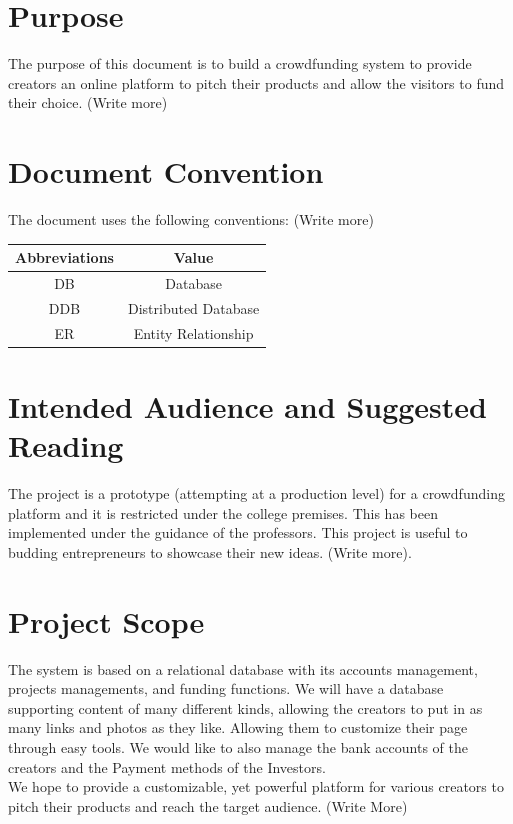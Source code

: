 \documentclass{report}[12pt]
\begin{document}
\section{Purpose}
The purpose of this document is to build a crowdfunding system to provide creators an online platform to pitch their products and allow the visitors to fund their choice. (Write more)

\section{Document Convention}
The document uses the following conventions: (Write more)
\begin{table}[h!]
    \centering
    \begin{tabular}{||c c||}
        \hline \hline 
         \textbf{Abbreviations}&\textbf{Value}  \\
         \hline
         DB&Database \\
         DDB&Distributed Database \\
         ER&Entity Relationship \\
        \hline \hline
    \end{tabular}
\end{table}

\section{Intended Audience and Suggested Reading}
The project is a prototype (attempting at a production level) for a crowdfunding platform and it is restricted under the college premises. This has been implemented under the guidance of the professors. This project is useful to budding entrepreneurs to showcase their new ideas. (Write more).

\section{Project Scope}
The system is based on a relational database with its accounts management, projects managements, and funding functions. We will have a database supporting content of many different kinds, allowing the creators to put in as many links and photos as they like. Allowing them to customize their page through easy tools. We would like to also manage the bank accounts of the creators and the Payment methods of the Investors.\\ 
We hope to provide a customizable, yet powerful platform for various creators to pitch their products and reach the target audience. (Write More)
\end{document}
